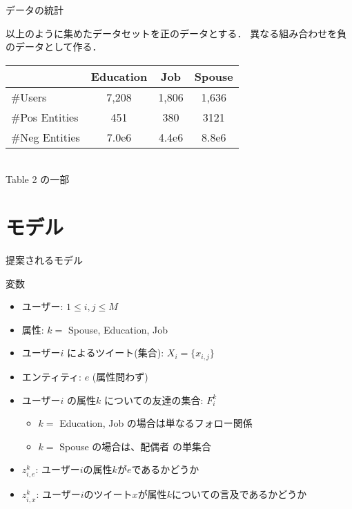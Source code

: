 \documentclass[12pt, dvipdfmx, default, cjk]{beamer}
\begin{document}
\begin{frame}{データの統計}

  以上のように集めたデータセットを正のデータとする．
  異なる組み合わせを負のデータとして作る．

  \begin{tabular}{|l | c | c | c |} \hline
    & Education & Job & Spouse \\ \hline
    \#Users & 7,208 & 1,806 & 1,636  \\ \hline
    \#Pos Entities & 451 & 380 & 3121 \\ \hline
    \#Neg Entities & 7.0e6 & 4.4e6 & 8.8e6 \\ \hline
  \end{tabular}
  \\
  Table 2 の一部
\end{frame}

\section{モデル}

\begin{frame}
  提案されるモデル
\end{frame}

\def\zkie{z^k_{i,e}}
\def\zkix{z^k_{i,x}}

\begin{frame}{変数}

  \begin{itemize}
    \item ユーザー: $1 \le i, j \le M$
    \item 属性: $k = $ Spouse, Education, Job
    \item ユーザー$i$ によるツイート(集合): $X_i = \{x_{i,j}\}$
    \item エンティティ: $e$ (属性問わず)
    \item ユーザー$i$ の属性$k$ についての友達の集合: $F_i^k$
      \begin{itemize}
        \item $k =$ Education, Job の場合は単なるフォロー関係
        \item $k =$ Spouse の場合は、配偶者 の単集合
      \end{itemize}
    \item $\zkie$: ユーザー$i$の属性$k$が$e$であるかどうか
    \item $\zkix$: ユーザー$i$のツイート$x$が属性$k$についての言及であるかどうか
  \end{itemize}
\end{frame}
\end{document}
